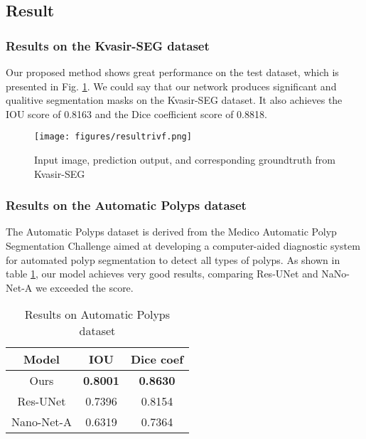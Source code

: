 \documentclass[conference]{IEEEtran}
\begin{document}
\vspace{-4mm}
\subsection{Result}
\subsubsection{Results on the Kvasir-SEG dataset}
Our proposed method shows great performance on the test dataset, which is presented in Fig. \ref{fig:result}. We could say that our network produces significant and qualitive segmentation masks on the Kvasir-SEG dataset. It also achieves the IOU score of 0.8163 and the Dice coefficient score of 0.8818.

\begin{figure} [H]
    \centering
    \texttt{[image: figures/resultrivf.png]}
    \caption{Input image, prediction output, and corresponding groundtruth from Kvasir-SEG}  
    \label{fig:result}
\end{figure}


\subsubsection{Results on the Automatic Polyps dataset}
The Automatic Polyps dataset \cite{jha2020medico} is derived from the Medico Automatic Polyp Segmentation Challenge aimed at developing a computer-aided diagnostic system for automated polyp segmentation to detect all types of polyps. As shown in table \ref{tab:tab2}, our model achieves very good results, comparing Res-UNet \cite{resunet} and NaNo-Net-A \cite{nano} we exceeded the score.
\begin{table}[H]
\begin{center}
\begin{tabular}{| c | c | c |} 
 \hline
 Model & IOU & Dice coef \\ [0.5ex] 
 \hline
 Ours & \textbf{0.8001} & \textbf{0.8630} \\
 \hline
 Res-UNet \cite{resunet} & 0.7396 & 0.8154 \\
 \hline
 Nano-Net-A \cite{nano} & 0.6319 & 0.7364 \\
 [1ex] 
 \hline
\end{tabular}
\end{center}
\caption{Results on Automatic Polyps dataset \cite{jha2020medico}}
\label{tab:tab2}
\end{table}
\end{document}
